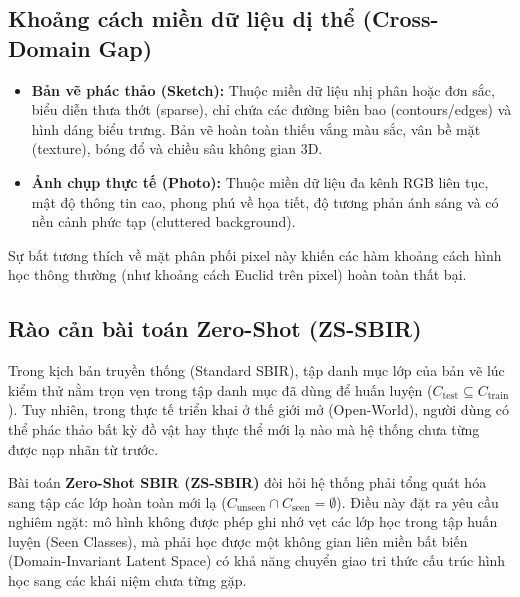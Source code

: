 \documentclass[12pt,a4paper]{report}
\begin{document}
\subsection{Khoảng cách miền dữ liệu dị thể (Cross-Domain Gap)}
\begin{itemize}[leftmargin=*]
    \item \textbf{Bản vẽ phác thảo (Sketch):} Thuộc miền dữ liệu nhị phân hoặc đơn sắc, biểu diễn thưa thớt (sparse), chỉ chứa các đường biên bao (contours/edges) và hình dáng biểu trưng. Bản vẽ hoàn toàn thiếu vắng màu sắc, vân bề mặt (texture), bóng đổ và chiều sâu không gian 3D.
    \item \textbf{Ảnh chụp thực tế (Photo):} Thuộc miền dữ liệu đa kênh RGB liên tục, mật độ thông tin cao, phong phú về họa tiết, độ tương phản ánh sáng và có nền cảnh phức tạp (cluttered background).
\end{itemize}
Sự bất tương thích về mặt phân phối pixel này khiến các hàm khoảng cách hình học thông thường (như khoảng cách Euclid trên pixel) hoàn toàn thất bại.

\subsection{Rào cản bài toán Zero-Shot (ZS-SBIR)}
Trong kịch bản truyền thống (Standard SBIR), tập danh mục lớp của bản vẽ lúc kiểm thử nằm trọn vẹn trong tập danh mục đã dùng để huấn luyện ($C_{\text{test}} \subseteq C_{\text{train}}$). Tuy nhiên, trong thực tế triển khai ở thế giới mở (Open-World), người dùng có thể phác thảo bất kỳ đồ vật hay thực thể mới lạ nào mà hệ thống chưa từng được nạp nhãn từ trước.

Bài toán \textbf{Zero-Shot SBIR (ZS-SBIR)} đòi hỏi hệ thống phải tổng quát hóa sang tập các lớp hoàn toàn mới lạ ($C_{\text{unseen}} \cap C_{\text{seen}} = \emptyset$). Điều này đặt ra yêu cầu nghiêm ngặt: mô hình không được phép ghi nhớ vẹt các lớp học trong tập huấn luyện (Seen Classes), mà phải học được một không gian liên miền bất biến (Domain-Invariant Latent Space) có khả năng chuyển giao tri thức cấu trúc hình học sang các khái niệm chưa từng gặp.
\end{document}
